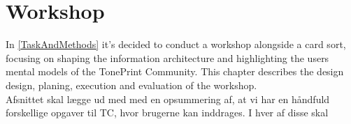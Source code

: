 \chapter{Workshop}
\label{ChapterWorkshop}
In \autoref{TaskAndMethods} it's decided to conduct a workshop alongside a card sort, focusing on shaping the information architecture and highlighting the users mental models of the TonePrint Community. This chapter describes the design design, planing, execution and evaluation of the workshop.\\

\noindent
Afsnittet skal lægge ud med med en opsummering af, at vi har en håndfuld forskellige opgaver til TC, hvor brugerne kan inddrages. I hver af disse skal  

